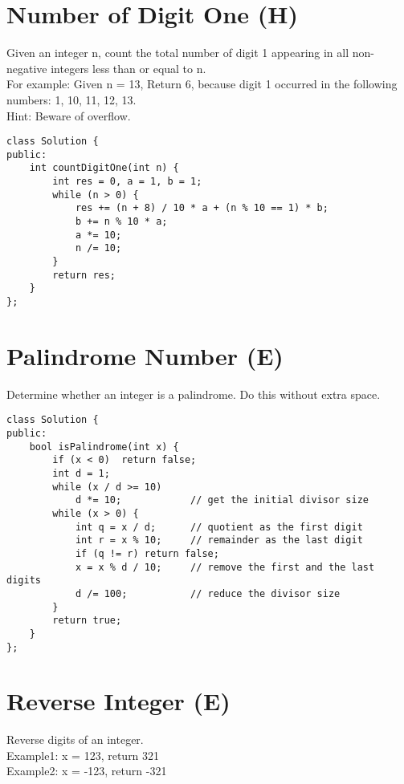\section{Number of Digit One (H)}
Given an integer n, count the total number of digit 1 appearing in all non-negative integers less than or equal to n.\\

For example:
Given n = 13,
Return 6, because digit 1 occurred in the following numbers: 1, 10, 11, 12, 13.\\

Hint: Beware of overflow.\\

\begin{lstlisting}
class Solution {
public:
    int countDigitOne(int n) {
        int res = 0, a = 1, b = 1;
        while (n > 0) {
            res += (n + 8) / 10 * a + (n % 10 == 1) * b;
            b += n % 10 * a;
            a *= 10;
            n /= 10;
        }
        return res;
    }
};
\end{lstlisting}


\section{Palindrome Number (E)}
Determine whether an integer is a palindrome. Do this without extra space. \\

\begin{lstlisting}
class Solution {
public:
    bool isPalindrome(int x) {
        if (x < 0)  return false;
        int d = 1;      
        while (x / d >= 10) 
            d *= 10;            // get the initial divisor size
        while (x > 0) {
            int q = x / d;      // quotient as the first digit
            int r = x % 10;     // remainder as the last digit
            if (q != r) return false;
            x = x % d / 10;     // remove the first and the last digits
            d /= 100;           // reduce the divisor size
        }
        return true;
    }
};
\end{lstlisting}


\section{Reverse Integer (E)}
Reverse digits of an integer. \\

Example1: x = 123, return 321\\
Example2: x = -123, return -321\\ 

